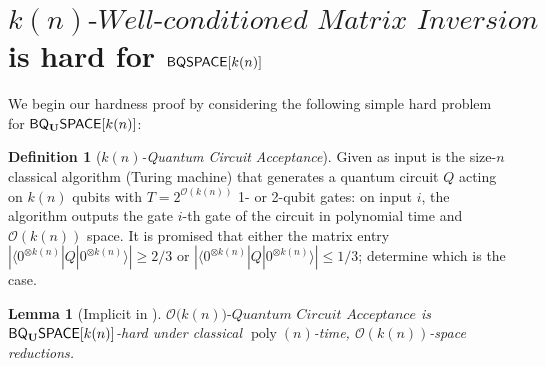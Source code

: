 \documentclass[11pt]{article}
\newtheorem{lemma}[theorem]{Lemma}
\theoremstyle{definition}
\newtheorem{definition}[theorem]{Definition}
\theoremstyle{remark}
\newcommand\BQSPACE{{\sf{BQSPACE}}}
\newcommand\matrixinvert[1]{{\ensuremath{#1}}\textit{-Well-conditioned Matrix Inversion}}
\newcommand\qca[1]{\ensuremath{#1}\textit{-Quantum Circuit Acceptance}}
\newcommand{\zero}{\ensuremath{0^{\otimes{k(n)}}}}
\newcommand{\classfont}{\sf}
\newcommand{\Unitary}{\mathbf{U}}
\newcommand{\unitaryBQSPACE}[1]{{\classfont{BQ}_\Unitary\classfont{SPACE}}[#1]}
\newcommand\bigoh{\mathcal{O}}
\DeclareMathOperator{\poly}{poly}
\begin{document}
\section{$\matrixinvert{k(n)}$ is hard for $\BQSPACE[k(n)]$}\label{app: matrixinversion-hardness}
We begin our hardness proof by considering the following simple hard problem for $\unitaryBQSPACE{k(n)}$:\begin{definition}[\qca{k(n)}]
	Given as input is the size-$n$ classical algorithm (Turing machine) that generates a quantum circuit $Q$ acting on $k(n)$ qubits with $T = 2^{\mathcal{O}(k(n))}$ 1- or 2-qubit gates: on input $i$, the algorithm outputs the gate $i$-th gate of the circuit in polynomial time and $\bigoh(k(n))$ space. It is promised that either the matrix entry $|\langle {\zero}|Q|{\zero}\rangle| \geq 2/3$ or $|\langle {\zero}|Q|{\zero}\rangle| \leq 1/3$; determine which is the case.
\end{definition}
\begin{lemma}[Implicit in \cite{bbbv,dawsonnielsen}]\label{lem: quantum circuit acceptance}
$\bigoh(\qca{k(n))}$ is $\unitaryBQSPACE{k(n)}$-hard under classical $\poly(n)$-time, $\bigoh(k(n))$-space reductions.
\end{lemma}
\end{document}
